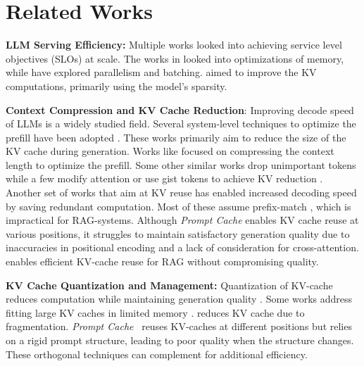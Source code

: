 \section{Related Works}
\label{sec:related_works}


\noindent\textbf{LLM Serving Efficiency:} Multiple works looked into achieving service level objectives (SLOs) at scale\cite{crankshaw2020inferline,crankshaw2017clipper,gujarati2020serving,shen2019nexus}. 
The  works in \cite{dao2022flashattention,kwon2023efficient,shi2023welder} looked into optimizations of memory, while \cite{han2022microsecond,zhang2023shepherd,yu2022orca} have explored parallelism and batching. 
\cite{dettmers2022gpt3,kwon2022fast,frantar2023sparsegpt} aimed to improve the KV computations, primarily using the model's sparsity. 

\noindent\textbf{Context Compression and KV Cache Reduction}: Improving decode speed of LLMs is a widely studied field. Several system-level techniques to optimize the prefill have been adopted \cite{qu2022dota,guo2023olive,ham2021elsa}.  
These works primarily aim to reduce the size of the KV cache during generation. Works like \cite{dong2024get,jiang2023llmlingua, jiang2023longllmlingua} focused on compressing the context length to optimize the prefill. 
Some other similar works \cite{liu2024scissorhands,zhang2024h2o,adnan2024keyformer} drop unimportant tokens while a few modify attention or use gist tokens to achieve KV reduction \cite{yan2021attention,mu2024learning}. Another set of works that aim at KV reuse has enabled increased decoding speed by saving redundant computation. Most of these assume prefix-match \cite{jin2024ragcache,liu2024optimizing,liu2023cachegen,zheng2023efficiently,gao2024attentionstore}, which is impractical for RAG-systems. 
Although \textit{Prompt Cache}\cite{gim2024prompt} enables KV cache reuse at various positions, it struggles to maintain satisfactory generation quality due to inaccuracies in positional encoding and a lack of consideration for cross-attention.
\sys enables efficient KV-cache reuse for RAG without compromising quality. 

\noindent\textbf{KV Cache Quantization and Management:} Quantization of KV-cache reduces computation while maintaining generation quality \cite{hooper2024kvquant,dong2024qaq}. Some works address fitting large KV caches in limited memory \cite{lee2024infinigen,kwon2023efficient,wang2023catalyst,wang2020put,ren2017slimdb}.
\vllm \cite{kwon2023efficient} reduces KV cache due to fragmentation.
\textit{Prompt Cache}~\cite{gim2024prompt} reuses KV-caches at different positions but relies on a rigid prompt structure, leading to poor quality when the structure changes.
These orthogonal techniques can complement \sys for additional efficiency.


